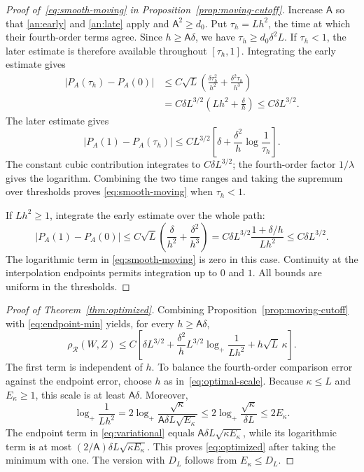\documentclass[11pt,letterpaper]{article}
\newif\ifshowrev
\newcommand{\rev}[1]{\ifshowrev{\color{revblue}%
\hypersetup{linkcolor=revblue,citecolor=revblue,urlcolor=revblue}#1}\else#1\fi}
\newcommand{\rs}[1]{\ifshowrev{\color{revblue}#1}\else#1\fi}
\newcommand{\Ac}{\rs{\mathsf A}}
\newif\ifshowtrim
\newcommand{\trim}[1]{\ifshowtrim{\color{revblue}%
\hypersetup{linkcolor=revblue,citecolor=revblue,urlcolor=revblue}#1}\else#1\fi}
\theoremstyle{remark}
\newcommand{\rh}{\rho_{\mathcal R}}
\begin{document}
\begin{proof}[\rev{Proof of~\eqref{eq:smooth-moving} in
Proposition~\ref{prop:moving-cutoff}}]
Increase \(\Ac\) so that \eqref{an:early} and \eqref{an:late} apply and
\(\Ac^2\ge d_0\). Put \(\tau_h=Lh^2\), the time at which their
fourth-order terms agree. Since \(h\ge\Ac\delta\), we have
\(\tau_h\ge d_0\delta^2L\). If \(\tau_h<1\), the later estimate
is therefore available throughout \([\tau_h,1]\). Integrating the
early estimate gives
\begin{align*}
 |P_A(\tau_h)-P_A(0)|
 &\le C\sqrt L\left(
 \frac{\delta\tau_h^2}{h^2}
 +\frac{\delta^2\tau_h}{h^3}\right)\\
 &=C\delta L^{3/2}
 \left(Lh^2+\frac\delta h\right)
 \le C\delta L^{3/2}.
\end{align*}
The later estimate gives
\[
 |P_A(1)-P_A(\tau_h)|
 \le CL^{3/2}\left[
 \delta+\frac{\delta^2}{h}\log\frac1{\tau_h}\right].
\]
The constant cubic contribution integrates to \(C\delta L^{3/2}\);
the fourth-order factor \(1/\lambda\) gives the logarithm. Combining
the two time ranges and taking the supremum over thresholds proves
\eqref{eq:smooth-moving} when \(\tau_h<1\).

If \(Lh^2\ge1\), integrate the early estimate over the whole path:
\[
 |P_A(1)-P_A(0)|
 \le C\sqrt L\left(\frac\delta{h^2}
 +\frac{\delta^2}{h^3}\right)
 =C\delta L^{3/2}\frac{1+\delta/h}{Lh^2}
 \le C\delta L^{3/2}.
\]
The logarithmic term in \eqref{eq:smooth-moving} is zero in this case.
Continuity at the interpolation endpoints permits integration up to
\(0\) and \(1\). All bounds are uniform in the thresholds.
\end{proof}

\begin{proof}[Proof of Theorem~\ref{thm:optimized}]
Combining Proposition~\ref{prop:moving-cutoff} with
\eqref{eq:endpoint-min} yields, for every \(h\ge\Ac\delta\),
\begin{equation}
 \rh(W,Z)\le C\left[
 \delta L^{3/2}
 +\frac{\delta^2}{h}L^{3/2}\log_+\frac1{Lh^2}
 +h\sqrt L\,\kappa\right].
 \label{eq:variational}
\end{equation}
The first term is independent of \(h\). To balance the fourth-order
comparison error against the endpoint error, choose \trim{\(h\) as
in~\eqref{eq:optimal-scale}}. Because \(\kappa\le L\) and \(E_\kappa\ge1\), this scale is at least
\(\Ac\delta\). Moreover,
\[
 \log_+\frac1{Lh^2}
 =2\log_+\frac{\sqrt\kappa}{\Ac\delta L\sqrt{E_\kappa}}
 \le2\log_+\frac{\sqrt\kappa}{\delta L}
 \le2E_\kappa.
\]
The endpoint term in \eqref{eq:variational} equals
\(\Ac\delta L\sqrt{\kappa E_\kappa}\), while its logarithmic term is at
most \((2/\Ac)\delta L\sqrt{\kappa E_\kappa}\).
This proves \eqref{eq:optimized} after taking the minimum with one.
The version with \(D_L\) follows from \(E_\kappa\le D_L\).
\end{proof}
\end{document}
